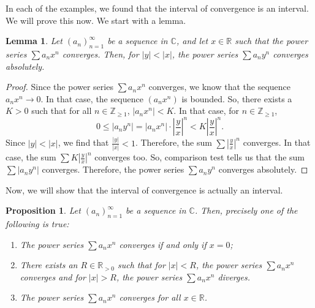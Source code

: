 \documentclass[a4paper, openany]{memoir}
\theoremstyle{definition}
\theoremstyle{plain}
\newtheorem{lemma}[definition]{Lemma}
\newtheorem{proposition}[definition]{Proposition}
\begin{document}
In each of the examples, we found that the interval of convergence is an interval. We will prove this now. We start with a lemma.
\begin{lemma}
Let $(a_n)_{n=1}^{\infty}$ be a sequence in $\mathbb{C}$, and let $x \in \mathbb{R}$ such that the power series $\sum a_n x^n$ converges. Then, for $|y| < |x|$, the power series $\sum a_n y^n$ converges absolutely.
\end{lemma}
\begin{proof}
Since the power series $\sum a_n x^n$ converges, we know that the sequence $a_n x^n \to 0$. In that case, the sequence $(a_n x^n)$ is bounded. So, there exists a $K > 0$ such that for all $n \in \mathbb{Z}_{\geqslant 1}$, $|a_n x^n| < K$. In that case, for $n \in \mathbb{Z}_{\geqslant 1}$,
\[0 \leqslant |a_n y^n| = |a_n x^n| \cdot \left|\frac{y}{x}\right|^n < K \left|\frac{y}{x}\right|^n.\]
Since $|y| < |x|$, we find that $\frac{|y|}{|x|} < 1$. Therefore, the sum $\sum |\frac{y}{x}|^n$ converges. In that case, the sum $\sum K |\frac{y}{x}|^n$ converges too. So, comparison test tells us that the sum $\sum |a_n y^n|$ converges. Therefore, the power series $\sum a_n y^n$ converges absolutely.
\end{proof}
\noindent Now, we will show that the interval of convergence is actually an interval.
\begin{proposition}
Let $(a_n)_{n=1}^{\infty}$ be a sequence in $\mathbb{C}$. Then, precisely one of the following is true:
\begin{enumerate}[label=(\arabic*)]
    \item The power series $\sum a_n x^n$ converges if and only if $x = 0$;
    \item There exists an $R \in \mathbb{R}_{> 0}$ such that for $|x| < R$, the power series $\sum a_n x^n$ converges and for $|x| > R$, the power series $\sum a_n x^n$ diverges.
    \item The power series $\sum a_n x^n$ converges for all $x \in \mathbb{R}$.
\end{enumerate}
\end{proposition}
\end{document}
